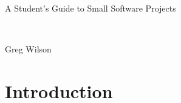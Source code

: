 \documentclass{report}
\begin{document}
\newcommand{\FIXME}[1]{}
\newcommand{\comment}[1]{\footnote{#1}}

\newcommand{\appref}[1]{Appendix~\ref{#1}}

\newcommand{\chaplbl}[2]{\chapter{#1}\label{#2}}
\newcommand{\chapref}[1]{Chapter~\ref{#1}}

\newcommand{\seclbl}[2]{\section{#1}\label{#2}}
\newcommand{\subseclbl}[2]{\subsection{#1}\label{#2}}

\newcommand{\subsubseclbl}[2]{\subsubsection{#1}\label{#2}}
\newcommand{\secref}[1]{Section~\ref{#1}}

\newcommand{\caplbl}[2]{\caption{#1}\label{#2}}
\newcommand{\figref}[1]{Figure~\ref{#1}}
\newcommand{\tblref}[1]{Table~\ref{#1}}

\newcommand{\code}[1]{{\tt #1}}
\newcommand{\defterm}[1]{\emph{#1}}
\newcommand{\url}[1]{#1}

\begin{titlepage}
  \begin{center}
    \begin{huge}A Student's Guide to Small Software Projects\end{huge}
    \\
    \begin{Large}Greg Wilson\end{Large}
  \end{center}
\end{titlepage}

\newpage

\tableofcontents

\newpage



\chaplbl{Introduction}{s:intro}
\end{document}
